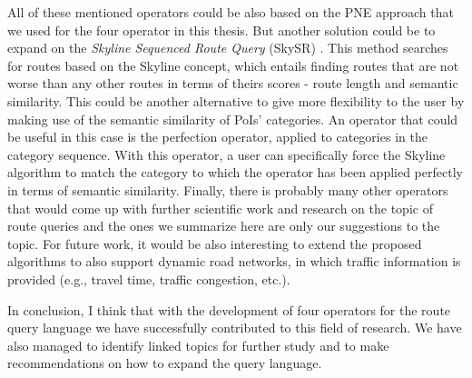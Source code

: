 All of these mentioned operators could be also based on the PNE approach that we used for the four operator in this thesis. But another solution could be to expand on the \textit{Skyline Sequenced Route Query} (SkySR) \cite{skyline}. This method searches for routes based on the Skyline concept, which entails finding routes that are not worse than any other routes in terms of theirs scores - route length and semantic similarity. This could be another alternative to give more flexibility to the user by making use of the semantic similarity of PoIs' categories. An operator that could be useful in this case is the perfection operator, applied to categories in the category sequence. With this operator, a user can specifically force the Skyline algorithm to match the category to which the operator has been applied perfectly in terms of semantic similarity. Finally, there is probably many other operators that would come up with further scientific work and research on the topic of route queries and the ones we summarize here are only our suggestions to the topic. For future work, it would be also interesting to extend the proposed algorithms to also support dynamic road networks, in which traffic information is provided (e.g., travel time, traffic congestion, etc.).

In conclusion, I think that with the development of four operators for the route query language we have successfully contributed to this field of research. We have also managed to identify linked topics for further study and to make recommendations on how to expand the query language. 

